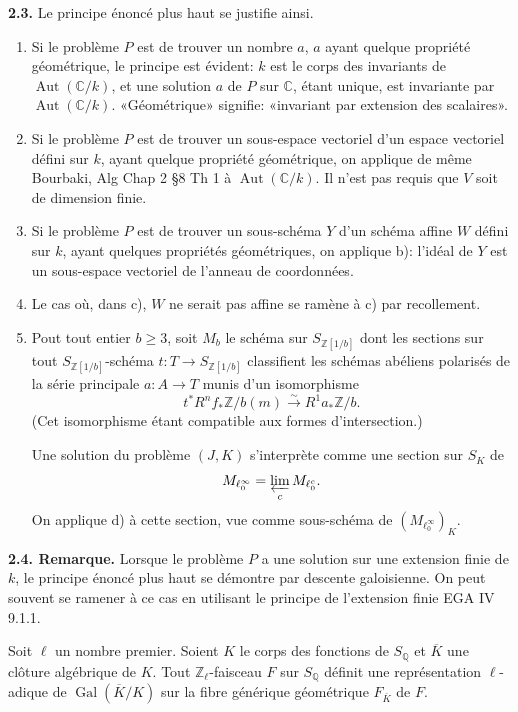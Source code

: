 \documentclass[10pt]{article}
\newcommand{\C}{\mathbb C}
\newcommand{\Q}{\mathbb Q}
\newcommand{\Z}{\mathbb Z}
\newcommand{\Aut}{\operatorname{Aut}}
\newcommand{\Gal}{\operatorname{Gal}}
\newcommand{\iso}{\xrightarrow{\sim}}
\newcommand{\sourcebreak}{\clearpage}
\begin{document}
\noindent\textbf{2.3.} Le principe énoncé plus haut se justifie ainsi.
\begin{enumerate}[label=\alph*)]
\item Si le problème \(P\) est de trouver un nombre \(a\), \(a\) ayant quelque propriété géométrique, le principe est évident: \(k\) est le corps des invariants de \(\Aut(\C/k)\), et une solution \(a\) de \(P\) sur \(\C\), étant unique, est invariante par \(\Aut(\C/k)\). «Géométrique» signifie: «invariant par extension des scalaires».
\item Si le problème \(P\) est de trouver un sous-espace vectoriel d'un espace vectoriel défini sur \(k\), ayant quelque propriété géométrique, on applique de même Bourbaki, Alg Chap 2 \S8 Th 1 à \(\Aut(\C/k)\). Il n'est pas requis que \(V\) soit de dimension finie.

\sourcebreak
\item Si le problème \(P\) est de trouver un sous-schéma \(Y\) d'un schéma affine \(W\) défini sur \(k\), ayant quelques propriétés géométriques, on applique b): l'idéal de \(Y\) est un sous-espace vectoriel de l'anneau de coordonnées.
\item Le cas où, dans c), \(W\) ne serait pas affine se ramène à c) par recollement.
\item Pout tout entier \(b\geq3\), soit \(M_b\) le schéma sur \(S_{\Z[1/b]}\) dont les sections sur tout \(S_{\Z[1/b]}\)-schéma \(t:T\longrightarrow S_{\Z[1/b]}\) classifient les schémas abéliens polarisés de la série principale \(a:A\longrightarrow T\) munis d'un isomorphisme
\[
t^*R^nf_*\Z/b(m)\iso R^1a_*\Z/b.
\]
(Cet isomorphisme étant compatible aux formes d'intersection.)

Une solution du problème \((J,K)\) s'interprète comme une section sur \(S_K\) de
\[
M_{\ell_0^\infty}=\varprojlim_c M_{\ell_0^c}.
\]
On applique d) à cette section, vue comme sous-schéma de \((M_{\ell_0^\infty})_K\).
\end{enumerate}

\noindent\textbf{2.4. Remarque.} Lorsque le problème \(P\) a une solution sur une extension finie de \(k\), le principe énoncé plus haut se démontre par descente galoisienne. On peut souvent se ramener à ce cas en utilisant le principe de l'extension finie EGA IV 9.1.1.

Soit \(\ell\) un nombre premier. Soient \(K\) le corps des fonctions de \(S_\Q\) et \(\overline K\) une clôture algébrique de \(K\). Tout \(\Z_\ell\)-faisceau \(F\) sur \(S_\Q\) définit une représentation \(\ell\)-adique de \(\Gal(\overline K/K)\) sur la fibre générique géométrique \(F_{\overline K}\) de \(F\).
\end{document}
